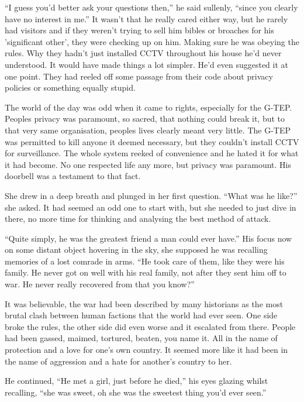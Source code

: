 ``I guess you'd better ask your questions then,'' he said sullenly, ``since you clearly have no interest in me.''  It wasn't that he really cared either way, but he rarely had visitors and if they weren't trying to sell him bibles or broaches for his 'significant other', they were checking up on him.  Making sure he was obeying the rules.  Why they hadn't just installed CCTV throughout his house he'd never understood.  It would have made things a lot simpler.  He'd even suggested it at one point.  They had reeled off some passage from their code about privacy policies or something equally stupid.

The world of the day was odd when it came to rights, especially for the G-TEP.  Peoples privacy was paramount, so sacred, that nothing could break it, but to that very same organisation, peoples lives clearly meant very little.  The G-TEP was permitted to kill anyone it deemed necessary, but they couldn't install CCTV for surveillance.  The whole system reeked of convenience and he hated it for what it had become.  No one respected life any more, but privacy was paramount.  His doorbell was a testament to that fact.

She drew in a deep breath and plunged in her first question.  ``What was he like?'' she asked.  It had seemed an odd one to start with, but she needed to just dive in there, no more time for thinking and analysing the best method of attack.

``Quite simply, he was the greatest friend a man could ever have.''  His focus now on some distant object hovering in the sky, she supposed he was recalling memories of a lost comrade in arms.  ``He took care of them, like they were his family.  He never got on well with his real family, not after they sent him off to war.  He never really recovered from that you know?''  

It was believable, the war had been described by many historians as the most brutal clash between human factions that the world had ever seen.  One side broke the rules, the other side did even worse and it escalated from there.  People had been gassed, maimed, tortured, beaten, you name it.  All in the name of protection and a love for one's own country.  It seemed more like it had been in the name of aggression and a hate for another's country to her.

He continued, ``He met a girl, just before he died,'' his eyes glazing whilst recalling, ``she was sweet, oh she was the sweetest thing you'd ever seen.''

